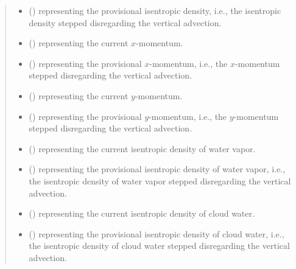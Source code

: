 \documentclass[letterpaper,10pt,english]{sphinxmanual}
\begin{document}
\begin{fulllineitems}
\begin{fulllineitems}
\begin{quote}
\begin{description}
\begin{itemize}
\item {} 
 () \textendash{}  representing the provisional isentropic density,
i.e., the isentropic density stepped disregarding the vertical advection.

\item {} 
 () \textendash{}  representing the current \(x\)-momentum.

\item {} 
 () \textendash{}  representing the provisional \(x\)-momentum,
i.e., the \(x\)-momentum stepped disregarding the vertical advection.

\item {} 
 () \textendash{}  representing the current \(y\)-momentum.

\item {} 
 () \textendash{}  representing the provisional \(y\)-momentum,
i.e., the \(y\)-momentum stepped disregarding the vertical advection.

\item {} 
 () \textendash{}  representing the current isentropic density of water vapor.

\item {} 
 () \textendash{}  representing the provisional isentropic density of water vapor,
i.e., the isentropic density of water vapor stepped disregarding the vertical advection.

\item {} 
 () \textendash{}  representing the current isentropic density of cloud water.

\item {} 
 () \textendash{}  representing the provisional isentropic density of cloud water,
i.e., the isentropic density of cloud water stepped disregarding the vertical advection.


\end{itemize}
\end{description}
\end{quote}
\end{fulllineitems}
\end{fulllineitems}
\end{document}
